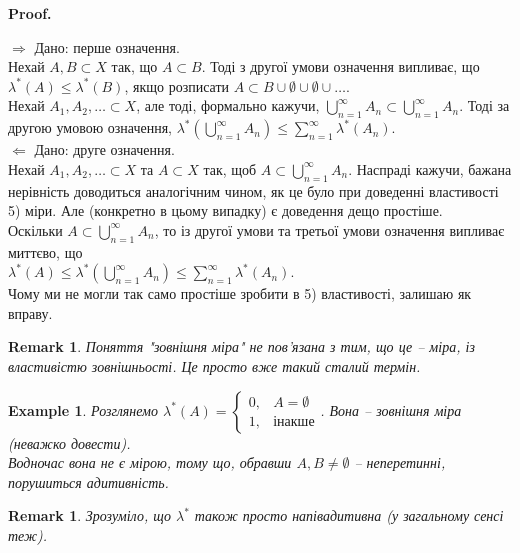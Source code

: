\documentclass[a4paper, 10pt]{article}
\makeatletter
\def\rightproof{$\boxed{\Rightarrow}$ }
\def\leftproof{$\boxed{\Leftarrow}$ }
\theoremstyle{theoremdd}
\newtheorem{example}[theorem]{Example}
\newtheorem{remark}[theorem]{Remark}
\renewenvironment{proof}[1][Proof.\\]{\par
\pushQED{\hfill \qed}%
\normalfont \topsep6\p@\@plus6\p@\relax
\trivlist
\item\relax
{\bfseries
#1\@addpunct{.}}\hspace\labelsep\ignorespaces
}{%
\popQED\endtrivlist\@endpefalse
}
\makeatother
\begin{document}
\begin{proof}
\rightproof Дано: перше означення. \\
Нехай $A,B \subset X$ так, що $A \subset B$. Тоді з другої умови означення випливає, що $\lambda^*(A) \leq \lambda^*(B)$, якщо розписати $A \subset B \cup \emptyset \cup \emptyset \cup \dots$.\\
Нехай $A_1,A_2,\dots \subset X$, але тоді, формально кажучи, $\displaystyle\bigcup_{n=1}^\infty A_n \subset \displaystyle\bigcup_{n=1}^\infty A_n$. Тоді за другою умовою означення, $\displaystyle\lambda^*\left(\bigcup_{n=1}^\infty A_n\right) \leq \sum_{n=1}^\infty \lambda^*(A_n)$.
\bigskip \\
\leftproof Дано: друге означення.\\
Нехай $A_1,A_2,\dots \subset X$ та $A \subset X$ так, щоб $A \subset \displaystyle\bigcup_{n=1}^\infty A_n$. Наспраді кажучи, бажана нерівність доводиться аналогічним чином, як це було при доведенні властивості 5) міри. Але (конкретно в цьому випадку) є доведення дещо простіше.\\
Оскільки $A \subset \displaystyle\bigcup_{n=1}^\infty A_n$, то із другої умови та третьої умови означення випливає миттєво, що \\ $\displaystyle\lambda^*(A) \leq \lambda^*\left( \bigcup_{n=1}^\infty A_n \right) \leq \sum_{n=1}^\infty \lambda^*(A_n)$.\\
Чому ми не могли так само простіше зробити в 5) властивості, залишаю як вправу.
\end{proof}

\begin{remark}
Поняття "зовнішня міра" не пов'язана з тим, що це -- міра, із властивістю зовнішньості. Це просто вже такий сталий термін.
\end{remark}

\begin{example}
Розглянемо $\lambda^*(A) = \begin{cases} 0, & A = \emptyset \\ 1, & \text{інакше} \end{cases}$. Вона -- зовнішня міра (неважко довести).\\
Водночас вона не є мірою, тому що, обравши $A,B \neq \emptyset$ -- неперетинні, порушиться адитивність.
\end{example}

\begin{remark}
Зрозуміло, що $\lambda^*$ також просто напівадитивна (у загальному сенсі теж).
\end{remark}
\end{document}
